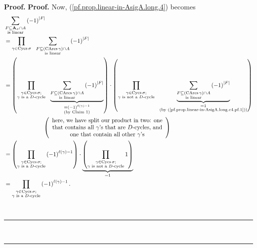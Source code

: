 \documentclass[numbers=enddot,12pt,final,onecolumn,notitlepage]{scrartcl}%
\numberwithin{exer}{section}
\theoremstyle{definition}
\newenvironment{proof}[1][Proof]{\noindent\textbf{#1.} }{\ \rule{0.5em}{0.5em}}
\let\sumnonlimits\sum
\let\prodnonlimits\prod
\renewcommand{\sum}{\sumnonlimits\limits}
\renewcommand{\prod}{\prodnonlimits\limits}
\newenvironment{verlong}{}{}
\begin{document}
\begin{verlong}
\begin{proof}
\begin{proof}
Now, (\ref{pf.prop.linear-in-AsigA.long.4}) becomes%
\begin{align*}
&  \sum_{\substack{F\subseteq\mathbf{A}_{\sigma}\cap A\\\text{is linear}%
}}\left(  -1\right)  ^{\left\vert F\right\vert }\\
&  =\prod_{\gamma\in\operatorname*{Cycs}\sigma}\ \ \sum_{\substack{F\subseteq
\left(  \operatorname*{CArcs}\gamma\right)  \cap A\\\text{is linear}}}\left(
-1\right)  ^{\left\vert F\right\vert }\\
&  =\left(  \prod_{\substack{\gamma\in\operatorname*{Cycs}\sigma
;\\\gamma\text{ is a }D\text{-cycle}}}\ \ \underbrace{\sum
_{\substack{F\subseteq\left(  \operatorname*{CArcs}\gamma\right)  \cap
A\\\text{is linear}}}\left(  -1\right)  ^{\left\vert F\right\vert }%
}_{\substack{=\left(  -1\right)  ^{\ell\left(  \gamma\right)  -1}\\\text{(by
Claim 1)}}}\right)  \cdot\left(  \prod_{\substack{\gamma\in
\operatorname*{Cycs}\sigma;\\\gamma\text{ is not a }D\text{-cycle}%
}}\ \ \underbrace{\sum_{\substack{F\subseteq\left(  \operatorname*{CArcs}%
\gamma\right)  \cap A\\\text{is linear}}}\left(  -1\right)  ^{\left\vert
F\right\vert }}_{\substack{=1\\\text{(by
(\ref{pf.prop.linear-in-AsigA.long.c4.pf.1}))}}}\right) \\
&  \ \ \ \ \ \ \ \ \ \ \ \ \ \ \ \ \ \ \ \ \left(
\begin{array}
[c]{c}%
\text{here, we have split our product in two: one}\\
\text{that contains all }\gamma\text{'s that are }D\text{-cycles, and}\\
\text{one that contain all other }\gamma\text{'s}%
\end{array}
\right) \\
&  =\left(  \prod_{\substack{\gamma\in\operatorname*{Cycs}\sigma
;\\\gamma\text{ is a }D\text{-cycle}}}\left(  -1\right)  ^{\ell\left(
\gamma\right)  -1}\right)  \cdot\underbrace{\left(  \prod_{\substack{\gamma
\in\operatorname*{Cycs}\sigma;\\\gamma\text{ is not a }D\text{-cycle}%
}}1\right)  }_{=1}\\
&  =\prod_{\substack{\gamma\in\operatorname*{Cycs}\sigma;\\\gamma\text{ is a
}D\text{-cycle}}}\left(  -1\right)  ^{\ell\left(  \gamma\right)  -1}.

\end{align*}
\end{proof}
\end{proof}
\end{verlong}
\end{document}
